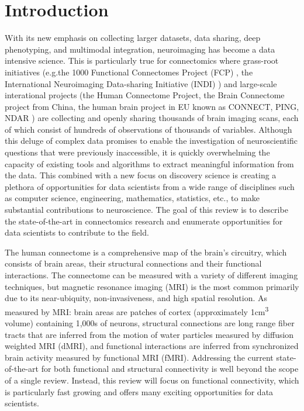 \section{Introduction}

With its new emphasis on collecting larger datasets, data sharing, deep
phenotyping, and multimodal integration, neuroimaging has become a data
intensive science. This is particularly true for connectomics where grass-root
initiatives (e.g.the 1000 Functional Connectomes Project (FCP)
\cite{Biswal2010}, the International Neuroimaging Data-sharing Initiative
(INDI) \cite{Mennes2013}) and large-scale interational projects (the Human
Connectome Project\cite{Sotiropoulus2013,VanEssen2012}, the Brain Connectome
project from China\cite{Jiang2013}, the human brain project in EU known as
CONNECT\cite{Assaf2013}, PING, NDAR ) are collecting and openly sharing thousands of brain imaging scans, each
of which consist of hundreds of observations of thousands of variables.
Although this deluge of complex data promises to enable the investigation of
neuroscientific questions that were previously inaccessible, it is quickly
overwhelming the capacity of existing tools and algorithms to extract
meaningful information from the data. This combined with a new focus on
discovery science is creating a plethora of opportunities for data scientists
from a wide range of disciplines such as computer science, engineering,
mathematics, statistics, etc., to make substantial contributions to
neuroscience. The goal of this review is to describe the state-of-the-art in
connectomics research and enumerate opportunities for data scientists to
contribute to the field.

The human connectome is a comprehensive map of the brain's circuitry, which
consists of brain areas, their structural connections and their functional
interactions. The connectome can be measured with a variety of different
imaging techniques, but magnetic resonance imaging (MRI) is the most common
primarily due to its near-ubiquity, non-invasiveness, and high spatial
resolution. As measured by MRI: brain areas are patches of cortex
(approximately 1\si{\centi\meter\cubed} volume) containing 1,000s of neurons,
structural connections are long range fiber tracts that are inferred from the
motion of water particles measured by diffusion weighted MRI (dMRI), and
functional interactions are inferred from synchronized brain activity measured
by functional MRI (fMRI). Addressing the current state-of-the-art for both
functional and structural connectivity is well beyond the scope of a single
review. Instead, this review will focus on functional connectivity, which is
particularly fast growing and offers many exciting opportunities for data
scientists.

